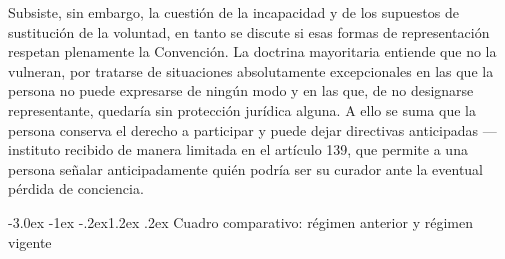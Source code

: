 \documentclass[12pt,oneside]{book}
\makeatletter
\renewcommand\section{\@startsection{section}{1}{\z@}%
  {-3.0ex \@plus -1ex \@minus -.2ex}{1.2ex \@plus .2ex}%
  {\normalfont\large\bfseries\color{acento}}}
\makeatother
\begin{document}
Subsiste, sin embargo, la cuestión de la incapacidad y de los supuestos de sustitución de la voluntad, en tanto se discute si esas formas de representación respetan plenamente la Convención. La doctrina mayoritaria entiende que no la vulneran, por tratarse de situaciones absolutamente excepcionales en las que la persona no puede expresarse de ningún modo y en las que, de no designarse representante, quedaría sin protección jurídica alguna. A ello se suma que la persona conserva el derecho a participar y puede dejar directivas anticipadas ---instituto recibido de manera limitada en el artículo 139, que permite a una persona señalar anticipadamente quién podría ser su curador ante la eventual pérdida de conciencia.

\section{Cuadro comparativo: régimen anterior y régimen vigente}
\end{document}
